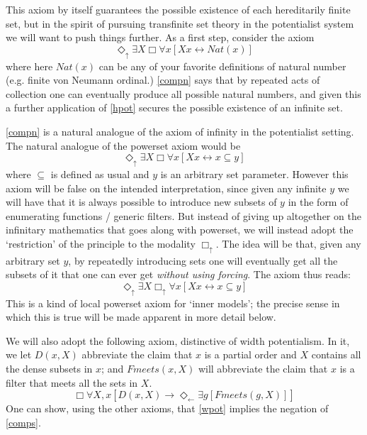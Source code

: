 \documentclass{article}
\theoremstyle{definition}
\newcommand{\du}{\Diamond_\uparrow}
\newcommand{\dl}{\Diamond_\leftarrow}
\newcommand{\bu}{\Box_\uparrow}
\begin{document}
This axiom by itself guarantees the possible existence of each hereditarily finite set, but 
in the spirit of pursuing transfinite set theory in the potentialist system we will want to 
push things further. As a first step, consider the axiom 
\begin{equation}\label{compn}
    \du \exists X \Box \forall x [ Xx \leftrightarrow Nat(x)]
\end{equation}
where here $Nat(x)$ can be any of your favorite definitions of natural number 
(e.g. finite von Neumann ordinal.) 
\eqref{compn} says that by repeated acts of collection one can eventually 
produce all possible natural numbers,
and given this a further application of \eqref{hpot} secures the possible 
existence of an infinite set.

\eqref{compn} is a natural analogue of the axiom of infinity in the potentialist setting. The 
natural analogue of the powerset axiom would be 
\begin{equation}\label{comps}
    \du \exists X \Box \forall x [ Xx \leftrightarrow x \subseteq y]
\end{equation}
where $\subseteq$ is defined as usual and $y$ is an arbitrary set parameter. However this 
axiom will be false on the intended interpretation, since given any infinite $y$ we will have 
that it is always possible to introduce new subsets of $y$ in the form of enumerating functions /
generic filters. But instead of giving up altogether on the infinitary mathematics that goes 
along with powerset, we will instead adopt the `restriction' of the principle to the modality $\bu$.
The idea will be that, given any arbitrary set $y$, by repeatedly introducing sets one will 
eventually get all the subsets of it that one can ever get \emph{without using forcing}. The 
axiom thus reads:
\begin{equation}\label{comps2}
    \du \exists X \bu \forall x [ Xx \leftrightarrow x \subseteq y]
\end{equation}
 This is 
a kind of local powerset axiom for `inner models'; the precise sense in which this is true will 
be made apparent in more detail below.

We will also adopt the following axiom, distinctive of width potentialism. In it, we let 
$D(x, X)$ abbreviate the claim that $x$ is a partial order and $X$ contains all the dense subsets 
in $x$; and $Fmeets(x, X)$ will abbreviate the claim that $x$ is a filter that 
meets all the sets in $X$.
\begin{equation}\label{wpot}
    \Box \forall X, x [D(x, X) \rightarrow \dl \exists g[Fmeets(g, X)]]
\end{equation}
One can show, using the other axioms, that \eqref{wpot} implies the negation of \eqref{comps}.
\end{document}
